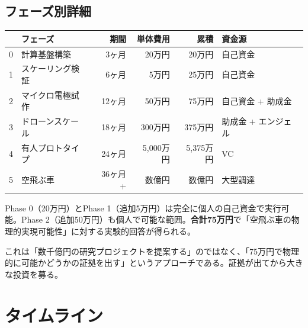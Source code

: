 \documentclass[12pt,a4paper]{ltjsarticle}
\begin{document}
\subsection{フェーズ別詳細}

\begin{center}
\sffamily\small
\begin{tabular}{@{}clrrrl@{}}
\toprule
& \textbf{フェーズ} & \textbf{期間} & \textbf{単体費用} & \textbf{累積} & \textbf{資金源} \\
\midrule
\cellcolor{phase0!20} 0 & 計算基盤構築 & 3ヶ月 & 20万円 & 20万円 & 自己資金 \\
\cellcolor{phase1!20} 1 & スケーリング検証 & 6ヶ月 & 5万円 & 25万円 & 自己資金 \\
\cellcolor{phase2!20} 2 & マイクロ電極試作 & 12ヶ月 & 50万円 & 75万円 & 自己資金 + 助成金 \\
\cellcolor{phase3!20} 3 & ドローンスケール & 18ヶ月 & 300万円 & 375万円 & 助成金 + エンジェル \\
\cellcolor{phase4!20} 4 & 有人プロトタイプ & 24ヶ月 & 5,000万円 & 5,375万円 & VC \\
\cellcolor{phase5!20} 5 & 空飛ぶ車 & 36ヶ月+ & 数億円 & 数億円 & 大型調達 \\
\bottomrule
\end{tabular}
\end{center}

\begin{infobox}
Phase 0（20万円）とPhase 1（追加5万円）は完全に個人の自己資金で実行可能。Phase 2（追加50万円）も個人で可能な範囲。\textbf{合計75万円}で「空飛ぶ車の物理的実現可能性」に対する実験的回答が得られる。

これは「数千億円の研究プロジェクトを提案する」のではなく、「75万円で物理的に可能かどうかの証拠を出す」というアプローチである。証拠が出てから大きな投資を募る。
\end{infobox}


\newpage
\section{タイムライン}
\end{document}
